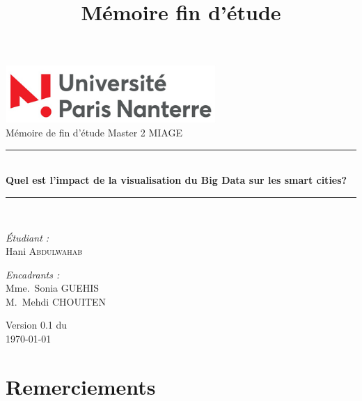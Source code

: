 \documentclass[french, a4paper, 12pt]{report}
\title{Mémoire fin d'étude }
\begin{document}

\begin{titlepage}
\begin{center}

\includegraphics[width=0.6\textwidth]{images/parisNanterre-logo}\\[1cm]

{\large Mémoire de fin d'étude Master 2 MIAGE}\\[0.5cm]



\rule{\linewidth}{0.5mm} \\[0.4cm]
{ \huge \bfseries Quel est l'impact de la visualisation du Big Data sur les smart cities? \\[0.4cm] }
\rule{\linewidth}{0.5mm} \\[1.5cm]

\noindent
\begin{minipage}{0.4\textwidth}
  \begin{flushleft} \large
    \emph{Étudiant :}\\
    Hani \textsc{Abdulwahab}
  \end{flushleft}
\end{minipage}%
\begin{minipage}{0.4\textwidth}
  \begin{flushright} \large
    \emph{Encadrants :} \\
    Mme.~Sonia \textsc{GUEHIS}\\
    M.~Mehdi \textsc{CHOUITEN }
    
  \end{flushright}
\end{minipage}

\vfill

{\large Version 0.1 du\\ \today}

\end{center}
\end{titlepage}

\tableofcontents
\listoffigures
\chapter*{Remerciements}
\end{document}
